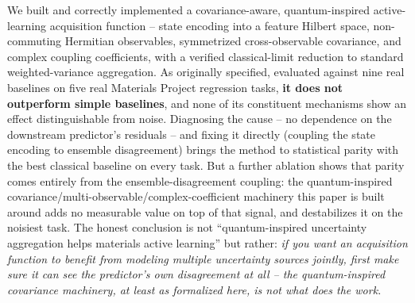 \documentclass[conference]{IEEEtran}
\begin{document}
We built and correctly implemented a covariance-aware, quantum-inspired active-learning acquisition function -- state encoding into a feature Hilbert space, non-commuting Hermitian observables, symmetrized cross-observable covariance, and complex coupling coefficients, with a verified classical-limit reduction to standard weighted-variance aggregation. As originally specified, evaluated against nine real baselines on five real Materials Project regression tasks, \textbf{it does not outperform simple baselines}, and none of its constituent mechanisms show an effect distinguishable from noise. Diagnosing the cause -- no dependence on the downstream predictor's residuals -- and fixing it directly (coupling the state encoding to ensemble disagreement) brings the method to statistical parity with the best classical baseline on every task. But a further ablation shows that parity comes entirely from the ensemble-disagreement coupling: the quantum-inspired covariance/multi-observable/complex-coefficient machinery this paper is built around adds no measurable value on top of that signal, and destabilizes it on the noisiest task. The honest conclusion is not ``quantum-inspired uncertainty aggregation helps materials active learning'' but rather: \emph{if you want an acquisition function to benefit from modeling multiple uncertainty sources jointly, first make sure it can see the predictor's own disagreement at all -- the quantum-inspired covariance machinery, at least as formalized here, is not what does the work.}

\balance


\end{document}
